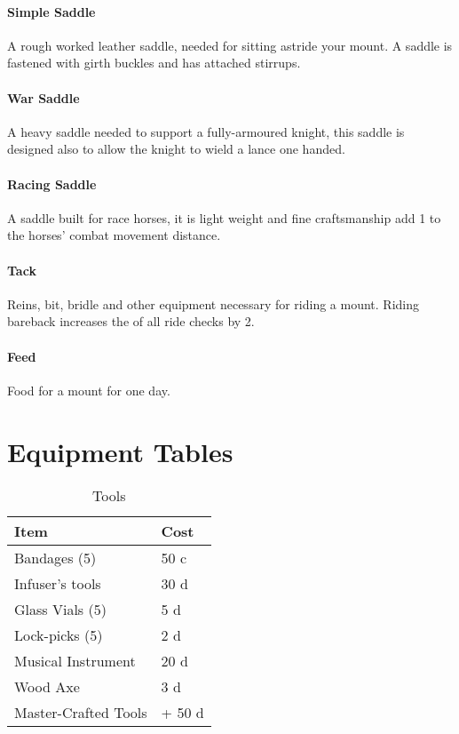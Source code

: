 \documentclass[a4paper,11pt,oneside]{book}
\newcommand{\textlf}[1]{\textbf{\titlecap{#1}}}
\begin{document}
\subsubsection*{Simple Saddle}
A rough worked leather saddle, needed for sitting astride your mount. A saddle is fastened with girth buckles and has attached stirrups.

\subsubsection*{War Saddle}
A heavy saddle needed to support a fully-armoured knight, this saddle is designed also to allow the knight to wield a lance one handed.

\subsubsection*{Racing Saddle}
A saddle built for race horses, it is light weight and fine craftsmanship add 1 to the horses' combat movement distance.

\subsubsection*{Tack}
Reins, bit, bridle and other equipment necessary for riding a mount. Riding bareback increases the \textlf{difficulty} of all ride checks by 2.

\subsubsection*{Feed}
Food for a mount for one day.

\chapter{Equipment Tables}
\begin{table}[ht]
	\centering
	\caption{Tools}
	\begin{tabular}{|l|l|}
		\hline
		Item & Cost\\ [0.5ex]
		\hline
		Bandages (5)& 50 c\\
		Infuser's tools & 30 d\\
		Glass Vials (5)& 5 d\\
		Lock-picks (5) & 2 d\\
		Musical Instrument & 20 d\\
		Wood Axe & 3 d\\		
		\hline
		Master-Crafted Tools & + 50 d\\
		\hline
	\end{tabular}
\end{table}
\end{document}
